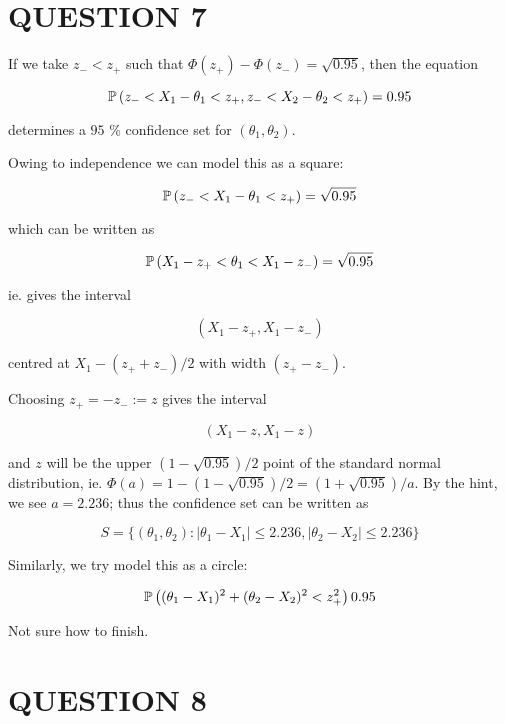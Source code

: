 \documentclass[a4paper]{article}
\begin{document}
\section{QUESTION 7}


If we take $ z_{-} < z_{+} $ such that $ \Phi(z_{+}) - \Phi(z_{-}) = \sqrt{0.95} $, then the equation

\[ \P \left(    z_{-} < X_{1} - \theta_{1} < z_{+}, z_{-} < X_{2} - \theta_{2} < z_{+} \right) = 0.95  \]

determines a $ 95 $ \% confidence set for $ (\theta_{1},\theta_{2}) $.
 
Owing to independence we can model this as a square:


\[  \P \left(    z_{-} < X_{1} - \theta_{1} < z_{+} \right) = \sqrt{0.95}  \]

which can be written as 

\[  \P \left(    X_{1} - z_{+} < \theta_{1} < X_{1} - z_{-} \right) = \sqrt{0.95}  \]

ie. gives the interval 

\[ \left(   X_{1} - z_{+}, X_{1} - z_{-} \right)  \]

centred at $ X_{1} - (z_{+} + z_{-})/2   $ with width $ (z_{+} - z_{-}) $.

Choosing $ z_{+} = - z_{-} := z $ gives the interval

\[ \left(  X_{1} - z, X_{1} - z  \right)  \]

and $ z $ will be the upper $ (1 - \sqrt{0.95})/2 $ point of the standard normal distribution, ie. $ \Phi(a) = 1 - ( 1 - \sqrt{0.95}) /2  = (1 + \sqrt{0.95})/a  $. By the hint, we see $ a = 2.236 $; thus the confidence set can be written as


\[ S = \{  (\theta_{1},\theta_{2}) : | \theta_{1} - X_{1} | \leq 2.236, | \theta_{2} - X_{2} | \leq 2.236   \}  \]


Similarly, we try model this as a circle:

\[ \P  \left(  (\theta_{1} - X_{1})^{2} + (\theta_{2} - X_{2})^{2} < z_{+}^{2} \right) 0.95   \]

Not sure how to finish. 



%
%
%
%

\section{QUESTION 8}
\end{document}
